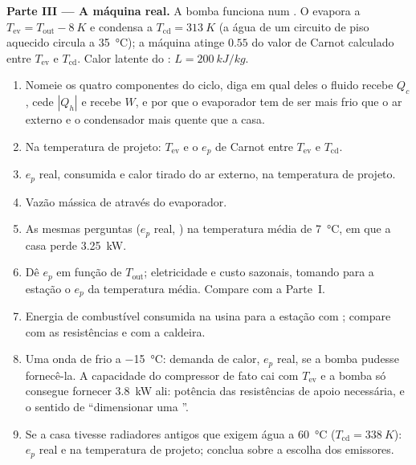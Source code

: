 \begin{problem}
\medskip
\noindent\textbf{Parte III --- A máquina real.}
A bomba funciona num . O 
evapora a $T_{\mathrm{ev}} = T_{\mathrm{out}} - \qty{8}{K}$ e condensa a
$T_{\mathrm{cd}} = \qty{313}{K}$ (a água de um circuito de piso aquecido
circula a \qty{35}{\degreeCelsius}); a máquina atinge $0.55$ do valor de
Carnot calculado entre $T_{\mathrm{ev}}$ e $T_{\mathrm{cd}}$. Calor latente do
: $L = \qty{200}{kJ/kg}$.
\begin{enumerate}[resume]
  \item Nomeie os quatro componentes do ciclo, diga em qual deles o fluido
        recebe $Q_c$, cede $|Q_h|$ e recebe $W$, e por que o
        evaporador tem de ser mais frio que o ar externo e o
        condensador mais quente que a casa.
  \item Na temperatura de projeto: $T_{\mathrm{ev}}$ e o $e_p$ de Carnot
        entre $T_{\mathrm{ev}}$ e $T_{\mathrm{cd}}$.
  \item $e_p$ real,  consumida e calor tirado do
        ar externo, na temperatura de projeto.
  \item Vazão mássica de  através do evaporador.
  \item As mesmas perguntas ($e_p$ real, ) na
        temperatura média de \qty{7}{\degreeCelsius}, em que a casa perde
        \qty{3.25}{kW}.
  \item Dê $e_p$ em função de $T_{\mathrm{out}}$; eletricidade e custo
        sazonais, tomando para a estação o $e_p$ da temperatura média.
        Compare com a Parte~I.
  \item Energia de combustível consumida na usina para a estação com ; compare com as resistências e com a caldeira.
  \item Uma onda de frio a \qty{-15}{\degreeCelsius}: demanda de calor, $e_p$
        real,  se a bomba pudesse fornecê-la. A capacidade
        do compressor de fato cai com $T_{\mathrm{ev}}$ e a bomba só consegue
        fornecer \qty{3.8}{kW} ali: potência das resistências de apoio
        necessária, e o sentido de ``dimensionar uma ''.
  \item Se a casa tivesse radiadores antigos que exigem água a
        \qty{60}{\degreeCelsius} ($T_{\mathrm{cd}} = \qty{338}{K}$): $e_p$ real
        e  na temperatura de projeto; conclua sobre a
        escolha dos emissores.
\end{enumerate}


\end{problem}

